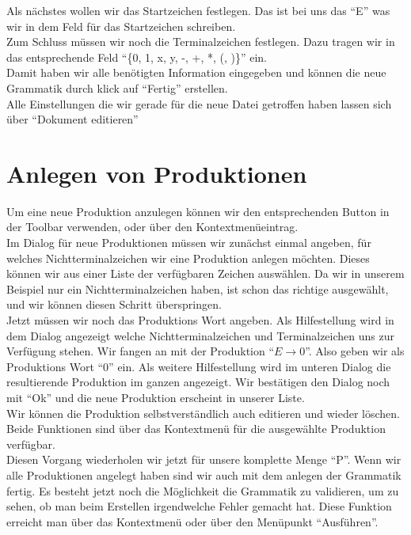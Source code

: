 Als nächstes wollen wir das Startzeichen festlegen. Das ist bei uns das "`E"'
was wir in dem Feld für das Startzeichen schreiben.\\
Zum Schluss müssen wir noch die Terminalzeichen festlegen. Dazu tragen
wir in das entsprechende Feld "`\{0, 1, x, y, -, +, *, (, )\}"' ein.\\
Damit haben wir alle benötigten Information eingegeben und können die neue
Grammatik durch klick auf "`Fertig"' erstellen.\\

Alle Einstellungen die wir gerade für die neue Datei getroffen haben lassen
sich über "`Dokument editieren"'

\section{Anlegen von Produktionen}

Um eine neue Produktion anzulegen können wir den entsprechenden Button in der
Toolbar verwenden, oder über den Kontextmenüeintrag.\\

Im Dialog für neue Produktionen müssen wir zunächst einmal angeben, für welches
Nichtterminalzeichen wir eine Produktion anlegen möchten. Dieses können wir aus
einer Liste der verfügbaren Zeichen auswählen. Da wir in unserem Beispiel nur
ein Nichtterminalzeichen haben, ist schon das richtige ausgewählt, und wir
können diesen Schritt überspringen.\\

Jetzt müssen wir noch das Produktions Wort angeben. Als Hilfestellung wird in
dem Dialog angezeigt welche Nichtterminalzeichen und Terminalzeichen uns zur
Verfügung stehen. Wir fangen an mit der Produktion "`$E \to 0$"'. Also geben
wir als Produktions Wort "`0"' ein. Als weitere Hilfestellung wird im unteren
Dialog die resultierende Produktion im ganzen angezeigt. Wir bestätigen den
Dialog noch mit "`Ok"' und die neue Produktion erscheint in unserer Liste.\\
Wir können die Produktion selbstverständlich auch editieren und wieder löschen.
Beide Funktionen sind über das Kontextmenü für die ausgewählte Produktion
verfügbar.\\

Diesen Vorgang wiederholen wir jetzt für unsere komplette Menge "`P"'. Wenn wir
alle Produktionen angelegt haben sind wir auch mit dem anlegen der Grammatik
fertig. Es besteht jetzt noch die Möglichkeit die Grammatik zu validieren, um
zu sehen, ob man beim Erstellen irgendwelche Fehler gemacht hat. Diese Funktion
erreicht man über das Kontextmenü oder über den Menüpunkt "`Ausführen"'.

